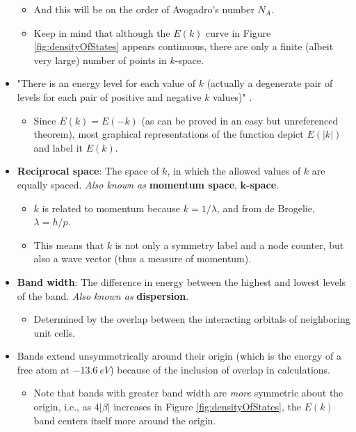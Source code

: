 \documentclass[../notes.tex]{subfiles}
\begin{document}
\begin{itemize}
    \begin{itemize}
        \item And this will be on the order of Avogadro's number $N_A$.
        \item Keep in mind that although the $E(k)$ curve in Figure \ref{fig:densityOfStates} appears continuous, there are only a finite (albeit very large) number of points in $k$-space.
    \end{itemize}
    \item "There is an energy level for each value of $k$ (actually a degenerate pair of levels for each pair of positive and negative $k$ values)" \parencite[848]{bib:bandTheory}.
    \begin{itemize}
        \item Since $E(k)=E(-k)$ (as can be proved in an easy but unreferenced theorem), most graphical representations of the function depict $E(|k|)$ and label it $E(k)$.
    \end{itemize}
    \item \textbf{Reciprocal space}: The space of $k$, in which the allowed values of $k$ are equally spaced. \emph{Also known as} \textbf{momentum space}, \textbf{$\bm{k}$-space}.
    \begin{itemize}
        \item $k$ is related to momentum because $k=1/\lambda$, and from de Brogelie, $\lambda=h/p$.
        \item This means that $k$ is not only a symmetry label and a node counter, but also a wave vector (thus a measure of momentum).
    \end{itemize}
    \item \textbf{Band width}: The difference in energy between the highest and lowest levels of the band. \emph{Also known as} \textbf{dispersion}.
    \begin{itemize}
        \item Determined by the overlap between the interacting orbitals of neighboring unit cells.
    \end{itemize}
    \item Bands extend unsymmetrically around their origin (which is the energy of a free  atom at $\SI{-13.6}{eV}$) because of the inclusion of overlap in calculations.
    \begin{itemize}
        \item Note that bands with greater band width are \emph{more} symmetric about the origin, i.e., as $4|\beta|$ increases in Figure \ref{fig:densityOfStates}, the $E(k)$ band centers itself more around the origin.

\end{itemize}
\end{itemize}
\end{document}
